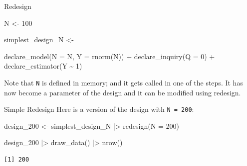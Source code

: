 \documentclass[
  11pt,
  ignorenonframetext,
]{beamer}
\newenvironment{Shaded}{\begin{snugshade}}{\end{snugshade}}
\newcommand{\AttributeTok}[1]{\textcolor[rgb]{0.40,0.45,0.13}{#1}}
\newcommand{\DecValTok}[1]{\textcolor[rgb]{0.68,0.00,0.00}{#1}}
\newcommand{\FunctionTok}[1]{\textcolor[rgb]{0.28,0.35,0.67}{#1}}
\newcommand{\NormalTok}[1]{\textcolor[rgb]{0.00,0.23,0.31}{#1}}
\newcommand{\OtherTok}[1]{\textcolor[rgb]{0.00,0.23,0.31}{#1}}
\newcommand{\SpecialCharTok}[1]{\textcolor[rgb]{0.37,0.37,0.37}{#1}}
\begin{document}
\begin{frame}[fragile]{Redesign}
\protect\hypertarget{redesign-3}{}
\begin{Shaded}
\begin{Highlighting}[]
\NormalTok{N }\OtherTok{\textless{}{-}} \DecValTok{100}

\NormalTok{simplest\_design\_N }\OtherTok{\textless{}{-}} 
  
  \FunctionTok{declare\_model}\NormalTok{(}\AttributeTok{N =}\NormalTok{ N, }\AttributeTok{Y =} \FunctionTok{rnorm}\NormalTok{(N)) }\SpecialCharTok{+}
  \FunctionTok{declare\_inquiry}\NormalTok{(}\AttributeTok{Q =} \DecValTok{0}\NormalTok{) }\SpecialCharTok{+}
  \FunctionTok{declare\_estimator}\NormalTok{(Y }\SpecialCharTok{\textasciitilde{}} \DecValTok{1}\NormalTok{)}
\end{Highlighting}
\end{Shaded}

Note that \texttt{N} is defined in memory; and it gets called in one of
the steps. It has now become a parameter of the design and it can be
modified using redesign.
\end{frame}

\begin{frame}[fragile]{Simple Redesign}
\protect\hypertarget{simple-redesign}{}
Here is a version of the design with \texttt{N\ =\ 200}:

\begin{Shaded}
\begin{Highlighting}[]
\NormalTok{design\_200 }\OtherTok{\textless{}{-}}\NormalTok{ simplest\_design\_N }\SpecialCharTok{|\textgreater{}} \FunctionTok{redesign}\NormalTok{(}\AttributeTok{N =} \DecValTok{200}\NormalTok{)}
  
\NormalTok{design\_200 }\SpecialCharTok{|\textgreater{}} \FunctionTok{draw\_data}\NormalTok{() }\SpecialCharTok{|\textgreater{}} \FunctionTok{nrow}\NormalTok{()}
\end{Highlighting}
\end{Shaded}

\begin{verbatim}
[1] 200
\end{verbatim}
\end{frame}
\end{document}
